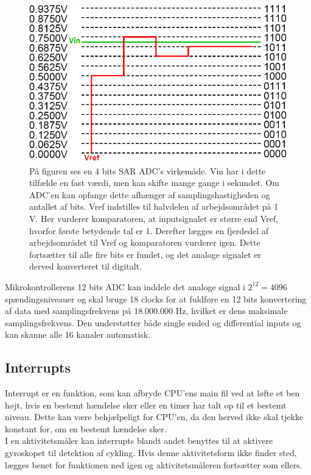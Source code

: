 \begin{figure}[H]
	\centering
	\includegraphics[scale=0.6]{figures/bProblemloesning/SAR_ADC.png}
	\caption{På figuren ses en 4 bits SAR ADC's virkemåde. Vin har i dette tilfælde en fast værdi, men kan skifte mange gange i sekundet. Om ADC'en kan opfange dette afhænger af samplingshastigheden og antallet af bits. Vref indstilles til halvdelen af arbejdsområdet på 1 V. Her vurderer komparatoren, at inputsignalet er større end Vref, hvorfor første betydende tal er 1. Derefter lægges en fjerdedel af arbejdsområdet til Vref og komparatoren vurderer igen. Dette fortsætter til alle fire bits er fundet, og det analoge signalet er derved konverteret til digitalt.}
	\label{fig:SAR_ADC}
\end{figure}\vspace{-0.5cm}
Mikrokontrollerens 12 bits ADC kan inddele det analoge signal i $2^{12} = 4096$ spændingsniveauer og skal bruge 18 clocks for at fuldføre en 12 bits konvertering af data med samplingsfrekvens på 18.000.000 Hz, hvilket er dens maksimale samplingsfrekvens. Den understøtter både single ended og differential inputs og kan skanne alle 16 kanaler automatisk. \citep{Semiconductor20164200M,Moore2004}

\subsection{Interrupts}
Interrupt er en funktion, som kan afbryde CPU'ens main fil ved at løfte et ben højt, hvis en bestemt hændelse sker eller en timer har talt op til et bestemt niveau. Dette kan være behjælpeligt for CPU'en, da den herved ikke skal tjekke konstant for, om en bestemt hændelse sker. \citep{Badiger2016} \\
I en aktivitetsmåler kan interrupts blandt andet benyttes til at aktivere gyroskopet til detektion af cykling. Hvis denne aktivitetsform ikke finder sted, lægges benet for funktionen ned igen og aktivitetsmåleren fortsætter som ellers.

